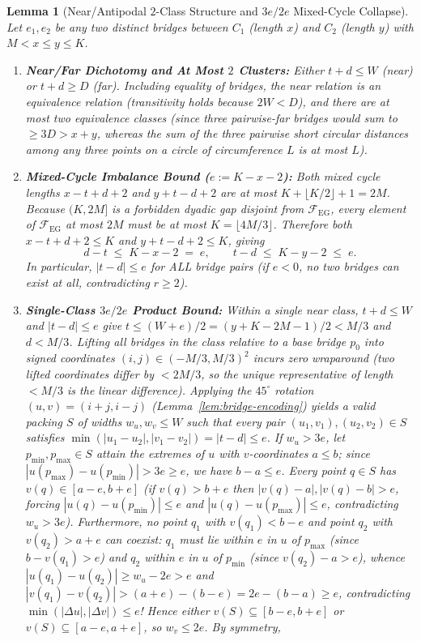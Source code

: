 \documentclass[11pt,reqno]{amsart}
\theoremstyle{plain}
\newtheorem{lemma}[theorem]{Lemma}
\theoremstyle{definition}
\theoremstyle{remark}
\newcommand{\FEG}{\mathcal{F}_{\mathrm{EG}}}
\DeclareRobustCommand{\_}{\ifmmode\text{\textunderscore}\else\textunderscore\allowbreak\fi}
\begin{document}
\begin{lemma}[Near/Antipodal $2$-Class Structure and $3e/2e$ Mixed-Cycle Collapse]\label{lem:equal-geom}
Let $e_1, e_2$ be any two distinct bridges between $C_1$ (length $x$) and $C_2$ (length $y$) with $M < x \le y \le K$.
\begin{enumerate}[label=(\roman*),leftmargin=2.2em]
  \item \textbf{Near/Far Dichotomy and At Most $2$ Clusters:} Either $t + d \le W$ (\emph{near}) or $t + d \ge D$ (\emph{far}). Including equality of bridges, the near relation is an equivalence relation (transitivity holds because $2W < D$), and there are \emph{at most two} equivalence classes (since three pairwise-far bridges would sum to $\ge 3D > x + y$, whereas the sum of the three pairwise short circular distances among any three points on a circle of circumference $L$ is at most $L$).
  \item \textbf{Mixed-Cycle Imbalance Bound ($e := K - x - 2$):} Both mixed cycle lengths $x - t + d + 2$ and $y + t - d + 2$ are at most $K + \lfloor K/2 \rfloor + 1 = 2M$. Because $(K, 2M]$ is a forbidden dyadic gap disjoint from $\FEG$, every element of $\FEG$ at most $2M$ must be at most $K = \lfloor 4M/3 \rfloor$. Therefore both $x - t + d + 2 \le K$ and $y + t - d + 2 \le K$, giving
  \begin{equation}\label{eq:imbalance}
    d - t \;\le\; K - x - 2 \;=\; e, \qquad t - d \;\le\; K - y - 2 \;\le\; e.
  \end{equation}
  In particular, $|t - d| \le e$ for ALL bridge pairs (if $e < 0$, no two bridges can exist at all, contradicting $r \ge 2$).
  \item \textbf{Single-Class $3e/2e$ Product Bound:} Within a single near class, $t + d \le W$ and $|t - d| \le e$ give $t \le (W + e)/2 = (y + K - 2M - 1)/2 < M/3$ and $d < M/3$. Lifting all bridges in the class relative to a base bridge $p_0$ into signed coordinates $(i, j) \in (-M/3, M/3)^2$ incurs zero wraparound (two lifted coordinates differ by $< 2M/3$, so the unique representative of length $< M/3$ is the linear difference). Applying the $45^\circ$ rotation $(u, v) = (i + j, i - j)$ (Lemma~\ref{lem:bridge-encoding}) yields a valid packing $S$ of widths $w_u, w_v \le W$ such that every pair $(u_1, v_1), (u_2, v_2) \in S$ satisfies $\min(|u_1 - u_2|, |v_1 - v_2|) = |t - d| \le e$. If $w_u > 3e$, let $p_{\min}, p_{\max} \in S$ attain the extremes of $u$ with $v$-coordinates $a \le b$; since $|u(p_{\max}) - u(p_{\min})| > 3e \ge e$, we have $b - a \le e$. Every point $q \in S$ has $v(q) \in [a - e, b + e]$ (if $v(q) > b + e$ then $|v(q) - a|, |v(q) - b| > e$, forcing $|u(q) - u(p_{\min})| \le e$ and $|u(q) - u(p_{\max})| \le e$, contradicting $w_u > 3e$). Furthermore, no point $q_1$ with $v(q_1) < b - e$ and point $q_2$ with $v(q_2) > a + e$ can coexist: $q_1$ must lie within $e$ in $u$ of $p_{\max}$ (since $b - v(q_1) > e$) and $q_2$ within $e$ in $u$ of $p_{\min}$ (since $v(q_2) - a > e$), whence $|u(q_1) - u(q_2)| \ge w_u - 2e > e$ and $|v(q_1) - v(q_2)| > (a + e) - (b - e) = 2e - (b - a) \ge e$, contradicting $\min(|\Delta u|, |\Delta v|) \le e$! Hence either $v(S) \subseteq [b - e, b + e]$ or $v(S) \subseteq [a - e, a + e]$, so $w_v \le 2e$. By symmetry,

\end{enumerate}
\end{lemma}
\end{document}
